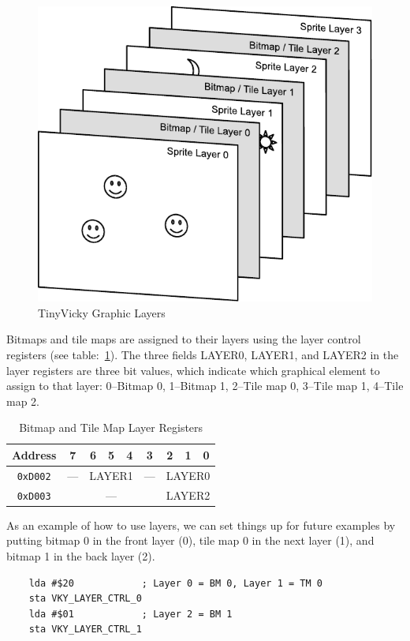 \begin{figure}[h]
    \begin{center}
        \includegraphics{images/Layers.pdf}
    \end{center}
    \caption{TinyVicky Graphic Layers}
    \label{fig:layers}
\end{figure}

Bitmaps and tile maps are assigned to their layers using the layer control registers (see table:~\ref{tab:bm_tm_layers}). The three fields LAYER0, LAYER1, and LAYER2 in the layer registers are three bit values, which indicate which graphical element to assign to that layer: 0--Bitmap 0, 1--Bitmap 1, 2--Tile map 0, 3--Tile map 1, 4--Tile map 2.

\begin{table}[h]
    \begin{center}
        \begin{tabular}{|c|c|c|c|c|c|c|c|c|} \hline
            Address & 7 & 6 & 5 & 4 & 3 & 2 & 1 & 0 \\ \hline\hline
            \verb+0xD002+ & --- & \multicolumn{3}{|c|}{LAYER1} & --- & \multicolumn{3}{|c|}{LAYER0} \\\hline
            \verb+0xD003+ & \multicolumn{5}{|c|}{---} & \multicolumn{3}{|c|}{LAYER2} \\\hline
        \end{tabular}
    \end{center}
    \caption{Bitmap and Tile Map Layer Registers}
    \label{tab:bm_tm_layers}
\end{table}


As an example of how to use layers, we can set things up for future examples by putting bitmap 0 in the front layer (0), tile map 0 in the next layer (1), and bitmap 1 in the back layer (2).

\begin{verbatim}
    lda #$20            ; Layer 0 = BM 0, Layer 1 = TM 0
    sta VKY_LAYER_CTRL_0
    lda #$01            ; Layer 2 = BM 1
    sta VKY_LAYER_CTRL_1
\end{verbatim}
